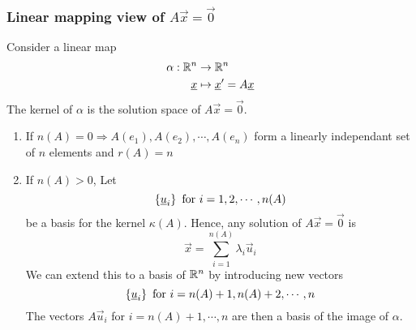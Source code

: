 \documentclass{article}
\numberwithin{equation}{section}
\begin{document}
\subsubsection{Linear mapping view of $A \vec x = \vec 0$}
Consider a linear map 
\begin{align*}
    \alpha: \mathbb{R}^n &\rightarrow \mathbb{R}^n \\
    \underline{x} &\mapsto \underline{x}' = A\underline{x} 
\end{align*}
The kernel of $\alpha$ is the solution space of $A \vec x = \vec 0$.
\begin{enumerate}
    \item If $n(A) = 0 \Rightarrow A(e_1), A(e_2), \cdots, A(e_n)$ form a linearly independant set of $n$ elements and $r(A) = n$
    \item If $n(A) > 0$, Let
    \[
        \left\{ \underline{u}_i \right\} \text{ for } i = 1, 2, \cdots, n(A)  
    \]
    be a basis for the kernel $\kappa (A)$. Hence, any solution of $A \vec x = \vec 0$ is 
    \[
        \vec x = \sum_{i=1}^{n(A)}\lambda_i \vec u_i  
    \]
    We can extend this to a basis of $\mathbb{R}^n$ by introducing new vectors
    \[
        \left\{ \underline{u}_i \right\} \text{ for } i = n(A)+1, n(A)+2, \cdots, n
    \]
    The vectors $A\vec u_i$ for $i = n(A)+1, \cdots, n$ are then a basis of the image of $\alpha$.
\end{enumerate}
\end{document}
